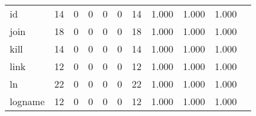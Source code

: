 \begin{longtable}{lp{1.2cm}p{1.2cm}p{1.2cm}p{1.2cm}p{1.2cm}p{1.2cm}p{1.2cm}p{1.2cm}p{1.2cm}p{1.2cm}}
id        &                                    14 &                                                  0 &                                                  0 &                                                  0 &                                                  0 &                                                 14 &                                              1.000 &                                              1.000 &                                              1.000 \\
join      &                                    18 &                                                  0 &                                                  0 &                                                  0 &                                                  0 &                                                 18 &                                              1.000 &                                              1.000 &                                              1.000 \\
kill      &                                    14 &                                                  0 &                                                  0 &                                                  0 &                                                  0 &                                                 14 &                                              1.000 &                                              1.000 &                                              1.000 \\
link      &                                    12 &                                                  0 &                                                  0 &                                                  0 &                                                  0 &                                                 12 &                                              1.000 &                                              1.000 &                                              1.000 \\
ln        &                                    22 &                                                  0 &                                                  0 &                                                  0 &                                                  0 &                                                 22 &                                              1.000 &                                              1.000 &                                              1.000 \\
logname   &                                    12 &                                                  0 &                                                  0 &                                                  0 &                                                  0 &                                                 12 &                                              1.000 &                                              1.000 &                                              1.000 \\

\end{longtable}
